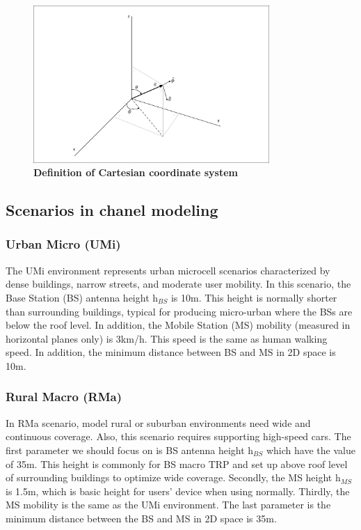 \documentclass{article} %
\begin{document}
\begin{figure}[htbp]
    \centering
    \includegraphics[width=0.8\textwidth, clip, trim=5 5 5 5]{Figure 7.1.1.pdf}
    \caption[Definition of Cartesian coordinate system~\cite{ETSI5G}]{\bfseries \fontsize{12pt}{0pt}\selectfont Definition of Cartesian coordinate system~\cite{ETSI5G}}
    \label{coordinate}
\end{figure}

\subsection{Scenarios in chanel modeling}
\subsubsection{Urban Micro (UMi)}
The UMi environment represents urban microcell scenarios characterized by dense buildings, narrow streets, and moderate user mobility. In this scenario, the Base Station (BS) antenna height $\mathrm{h}_{BS}$ is 10m. This height is normally shorter than surrounding buildings, typical for producing micro-urban where the BSs are below the roof level. In addition, the Mobile Station (MS) mobility (measured in horizontal planes only) is 3km/h. This speed is the same as human walking speed. In addition, the minimum distance between BS and MS in 2D space is 10m. \cite{ETSI5G}

\subsubsection{Rural Macro (RMa)}
In RMa scenario, model rural or suburban environments need wide and continuous coverage. Also, this scenario requires supporting high-speed cars. The first parameter we should focus on is BS antenna height $\mathrm{h}_{BS}$ which have the value of 35m. This height is commonly for BS macro TRP and set up above roof level of surrounding buildings to optimize wide coverage. Secondly, the MS height $\mathrm{h}_{MS}$ is 1.5m, which is basic height for users’ device when using normally. Thirdly, the MS mobility is the same as the UMi environment. The last parameter is the minimum distance between the BS and MS in 2D space is 35m. \cite{ETSI5G}
\end{document}
